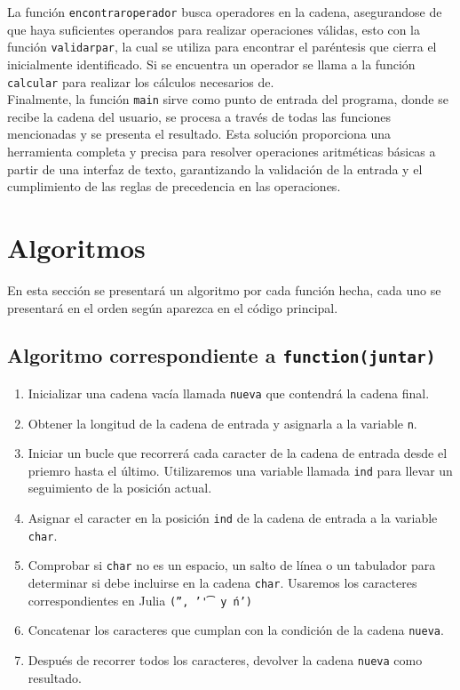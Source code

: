 \documentclass{article}
\begin{document}
La función \texttt{encontrar\textunderscore operador} busca operadores en la cadena, asegurandose de que haya suficientes operandos para realizar operaciones válidas, esto con la función \texttt{validar\textunderscore par}, la cual se utiliza para encontrar el paréntesis que cierra el inicialmente identificado. Si se encuentra un operador se llama a la función \texttt{calcular} para realizar los cálculos necesarios de.\\

Finalmente, la función \texttt{main} sirve como punto de entrada del programa, donde se recibe la cadena del usuario, se procesa a través de todas las funciones mencionadas y se presenta el resultado. Esta solución proporciona una herramienta completa y precisa para resolver operaciones aritméticas básicas a partir de una interfaz de texto, garantizando la validación de la entrada y el cumplimiento de las reglas de precedencia en las operaciones.\\


\section{Algoritmos}
En esta sección se presentará un algoritmo por cada función hecha, cada uno se presentará en el orden según aparezca en el código principal.

\subsection{Algoritmo correspondiente a \texttt{function(juntar)}}
\begin{enumerate}
    \item Inicializar una cadena vacía llamada \texttt{nueva} que contendrá la cadena final.

    \item Obtener la longitud de la cadena de entrada y asignarla a la variable \texttt{n}.

    \item Iniciar un bucle que recorrerá cada caracter de la cadena de entrada desde el priemro hasta el último. Utilizaremos una variable llamada \texttt{ind} para llevar un seguimiento de la posición actual. 

    \item Asignar el caracter en la posición \texttt{ind} de la cadena de entrada a la variable \texttt{char}.

    \item Comprobar si \texttt{char} no es un espacio, un salto de línea o un tabulador para determinar si debe incluirse en la cadena \texttt{char}. Usaremos los caracteres correspondientes en Julia \texttt{('', '\t' y \'n')}

    \item Concatenar los caracteres que cumplan con la condición de la cadena \texttt{nueva}.

    \item Después de recorrer todos los caracteres, devolver la cadena \texttt{nueva} como resultado.\\
\end{enumerate}
\end{document}
